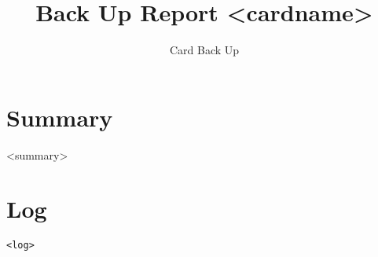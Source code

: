 \documentclass{report}
\title{Back Up Report <cardname>}
\author{Card Back Up}
\begin{document}
\maketitle

\section{Summary}


<summary>




\section{Log}

\begin{lstlisting}
<log>
\end{lstlisting}
\end{document}
